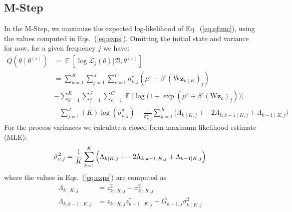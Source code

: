 \documentclass{article}
\DeclareMathOperator{\E}{\mathbb{E}}
\newcommand{\data}{\mathcal{D}}
\def\*#1{\mathbf{#1}}
\begin{document}
\subsection{M-Step}
In the M-Step, we maximize the expected log-likelihood of Eq.~(\ref{eq:qfunc}),
using the values computed in Eqs.~(\ref{eq:exps}). Omitting the initial state
and variance for now, for a given frequency $j$ we have:
\begin{equation}\label{eq:Q}
   \begin{split}
      Q(\theta \mid \theta^{(s)}) &= \E [\log \mathcal{L}_j(\theta)|\data,\theta^{(s)}] \\
      &= \sum_{k=1}^K \sum_{j=1}^J \sum_{c=1}^C n_{k,j}^c (\mu^c + \beta^c (\text{W}\*z_{k \mid K})_j) \\
      &- \sum_{k=1}^K \sum_{j=1}^J \sum_{c=1}^C \E \Big[ \log \big(1 + \exp( \mu^c + \beta^c (\text{W} \*z_k)_j ) \big) \Big ]\\
      &- \sum_{j=1}^J (K)\log(\sigma^2_{\nu,j}) - \frac{1}{\sigma^2_{\nu,j}}
      \sum_{k=1}^K \Big(\Lambda_{k \mid K,j} + -2\Lambda_{k,k-1 \mid K, j} + \Lambda_{k-1 \mid K, j}\Big) %
   \end{split}
\end{equation}
For the process variances we calculate a closed-form maximum likelihood estimate (MLE):
\begin{equation}\label{eq:sigma_mle}
   \hat{\sigma}^2_{\nu,j} = \frac{1}{K} \sum_{k=1}^K \Big(\Lambda_{k \mid K,j} + 
   -2\Lambda_{k,k-1 \mid K, j} + \Lambda_{k-1 \mid K, j}\Big) \\
\end{equation}
where the values in Eqs.~(\ref{eq:exps}) are computed as
\begin{equation}\label{exps_est}
   \begin{split}
      \Lambda_{k\mid K,j} &= z_{k \mid K,j}^2  + \sigma^2_{k \mid K,j} \\
      \Lambda_{k,k-1 \mid K, j} &= z_{k \mid K,j}  z^*_{k-1 \mid K,j} 
         + G_{k-1,j} \sigma^2_{k\mid K,j}
   \end{split}
\end{equation}
\end{document}
